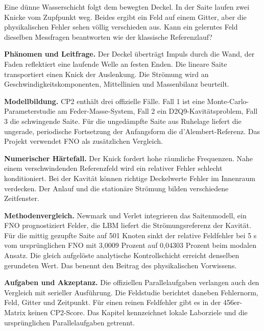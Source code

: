 Eine dünne Wasserschicht folgt dem bewegten Deckel. In der Saite laufen zwei Knicke vom Zupfpunkt weg. Beides ergibt ein Feld auf einem Gitter, aber die physikalischen Fehler sehen völlig verschieden aus. Kann ein gelerntes Feld dieselben Messfragen beantworten wie der klassische Referenzlauf?
\par\textsf{\bfseries\color{sea}Phänomen und Leitfrage.} Der Deckel überträgt Impuls durch die Wand, der Faden reflektiert eine laufende Welle an festen Enden. Die lineare Saite transportiert einen Knick der Auslenkung. Die Strömung wird an Geschwindigkeitskomponenten, Mittellinien und Massenbilanz beurteilt.
\par\textsf{\bfseries\color{sea}Modellbildung.} CP2 enthält drei offizielle Fälle. Fall 1 ist eine Monte-Carlo-Parameterstudie am Feder-Masse-System, Fall 2 ein D2Q9-Kavitätsproblem, Fall 3 die schwingende Saite. Für die ungedämpfte Saite aus Ruhelage liefert die ungerade, periodische Fortsetzung der Anfangsform die d’Alembert-Referenz. Das Projekt verwendet FNO als zusätzlichen Vergleich.
\par\textsf{\bfseries\color{sea}Numerischer Härtefall.} Der Knick fordert hohe räumliche Frequenzen. Nahe einem verschwindenden Referenzfeld wird ein relativer Fehler schlecht konditioniert. Bei der Kavität können richtige Deckelwerte Fehler im Innenraum verdecken. Der Anlauf und die stationäre Strömung bilden verschiedene Zeitfenster.
\par\textsf{\bfseries\color{sea}Methodenvergleich.} Newmark und Verlet integrieren das Saitenmodell, ein FNO prognostiziert Felder, die LBM liefert die Strömungsreferenz der Kavität. Für die mittig gezupfte Saite auf 501 Knoten sinkt der relative Feldfehler bei 5 s vom ursprünglichen FNO mit 3,0009 Prozent auf 0,04303 Prozent beim modalen Ansatz. Die gleich aufgelöste analytische Kontrollschicht erreicht denselben gerundeten Wert. Das benennt den Beitrag des physikalischen Vorwissens.
\par\textsf{\bfseries\color{sea}Aufgaben und Akzeptanz.} Die offiziellen Parallelaufgaben verlangen auch den Vergleich mit serieller Ausführung. Die Feldstudie berichtet daneben Fehlernorm, Feld, Gitter und Zeitpunkt. Für einen reinen Feldfehler gibt es in der 456er-Matrix keinen CP2-Score. Das Kapitel kennzeichnet lokale Laborziele und die ursprünglichen Parallelaufgaben getrennt.
